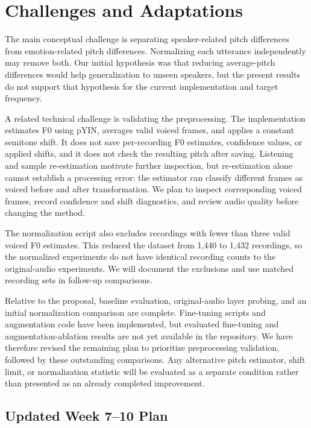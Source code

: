 \section{Challenges and Adaptations}

The main conceptual challenge is separating speaker-related pitch differences from emotion-related pitch differences. Normalizing each utterance independently may remove both. Our initial hypothesis was that reducing average-pitch differences would help generalization to unseen speakers, but the present results do not support that hypothesis for the current implementation and target frequency.

A related technical challenge is validating the preprocessing. The implementation estimates F0 using pYIN, averages valid voiced frames, and applies a constant semitone shift. It does not save per-recording F0 estimates, confidence values, or applied shifts, and it does not check the resulting pitch after saving. Listening and sample re-estimation motivate further inspection, but re-estimation alone cannot establish a processing error: the estimator can classify different frames as voiced before and after transformation. We plan to inspect corresponding voiced frames, record confidence and shift diagnostics, and review audio quality before changing the method.

The normalization script also excludes recordings with fewer than three valid voiced F0 estimates. This reduced the dataset from 1,440 to 1,432 recordings, so the normalized experiments do not have identical recording counts to the original-audio experiments. We will document the exclusions and use matched recording sets in follow-up comparisons.

Relative to the proposal, baseline evaluation, original-audio layer probing, and an initial normalization comparison are complete. Fine-tuning scripts and augmentation code have been implemented, but evaluated fine-tuning and augmentation-ablation results are not yet available in the repository. We have therefore revised the remaining plan to prioritize preprocessing validation, followed by these outstanding comparisons. Any alternative pitch estimator, shift limit, or normalization statistic will be evaluated as a separate condition rather than presented as an already completed improvement.

\subsection{Updated Week 7--10 Plan}

